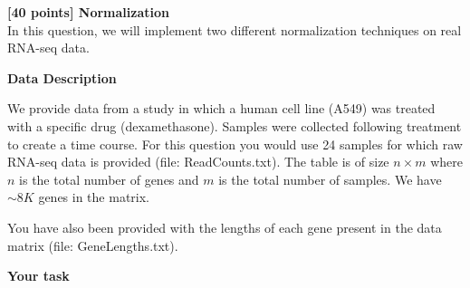 {\bf [40 points] Normalization}\\

In this question, we will implement two different normalization techniques on real RNA-seq data.

\textbf{Data Description}


We provide data from a study in which a human cell line (A549) was treated with a specific drug (dexamethasone). Samples were collected following treatment to create a time course. For this question you would use 24 samples for which raw RNA-seq data is provided (file: ReadCounts.txt). The table is of size $n\times m$ where $n$ is the total number of genes and $m$ is the total number of samples. We have $\sim 8K$ genes in the matrix. 

You have also been provided with the lengths of each gene present in the data matrix (file: GeneLengths.txt).

\vspace{20pt}

\textbf{Your task}


